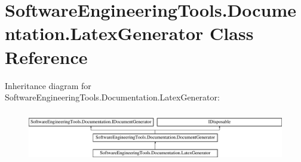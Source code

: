 \hypertarget{class_software_engineering_tools_1_1_documentation_1_1_latex_generator}{\section{Software\+Engineering\+Tools.\+Documentation.\+Latex\+Generator Class Reference}
\label{class_software_engineering_tools_1_1_documentation_1_1_latex_generator}
}
Inheritance diagram for Software\+Engineering\+Tools.\+Documentation.\+Latex\+Generator\+:\begin{figure}[H]
\begin{center}
\leavevmode
\includegraphics[height=2.240000cm]{class_software_engineering_tools_1_1_documentation_1_1_latex_generator}
\end{center}
\end{figure}
